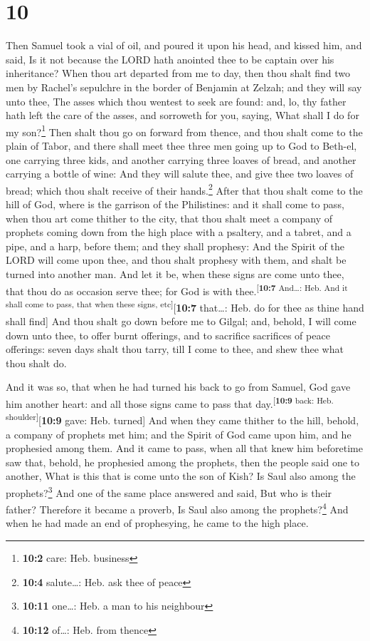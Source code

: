 \hypertarget{section-9}{%
\section{10}\label{section-9}}

 Then Samuel took a vial of oil, and poured it upon his
head, and kissed him, and said, Is it not because the LORD hath anointed
thee to be captain over his inheritance?  When thou art
departed from me to day, then thou shalt find two men by Rachel's
sepulchre in the border of Benjamin at Zelzah; and they will say unto
thee, The asses which thou wentest to seek are found: and, lo, thy
father hath left the care of the asses, and sorroweth for you, saying,
What shall I do for my son?\footnote{\textbf{10:2} care: Heb. business}
 Then shalt thou go on forward from thence, and thou shalt
come to the plain of Tabor, and there shall meet thee three men going up
to God to Beth-el, one carrying three kids, and another carrying three
loaves of bread, and another carrying a bottle of wine: 
And they will salute thee, and give thee two loaves of bread; which thou
shalt receive of their hands.\footnote{\textbf{10:4} salute\ldots: Heb.
  ask thee of peace}  After that thou shalt come to the
hill of God, where is the garrison of the Philistines: and it shall come
to pass, when thou art come thither to the city, that thou shalt meet a
company of prophets coming down from the high place with a psaltery, and
a tabret, and a pipe, and a harp, before them; and they shall prophesy:
 And the Spirit of the LORD will come upon thee, and thou
shalt prophesy with them, and shalt be turned into another man.
 And let it be, when these signs are come unto thee, that
thou do as occasion serve thee; for God is with
thee.\textsuperscript{{[}\textbf{10:7} And\ldots: Heb. And it shall come
to pass, that when these signs, etc{]}}{[}\textbf{10:7} that\ldots: Heb.
do for thee as thine hand shall find{]}  And thou shalt go
down before me to Gilgal; and, behold, I will come down unto thee, to
offer burnt offerings, and to sacrifice sacrifices of peace offerings:
seven days shalt thou tarry, till I come to thee, and shew thee what
thou shalt do.

 And it was so, that when he had turned his back to go
from Samuel, God gave him another heart: and all those signs came to
pass that day.\textsuperscript{{[}\textbf{10:9} back: Heb.
shoulder{]}}{[}\textbf{10:9} gave: Heb. turned{]}  And
when they came thither to the hill, behold, a company of prophets met
him; and the Spirit of God came upon him, and he prophesied among them.
 And it came to pass, when all that knew him beforetime
saw that, behold, he prophesied among the prophets, then the people said
one to another, What is this that is come unto the son of Kish? Is Saul
also among the prophets?\footnote{\textbf{10:11} one\ldots: Heb. a man
  to his neighbour}  And one of the same place answered
and said, But who is their father? Therefore it became a proverb, Is
Saul also among the prophets?\footnote{\textbf{10:12} of\ldots: Heb.
  from thence}  And when he had made an end of
prophesying, he came to the high place.

